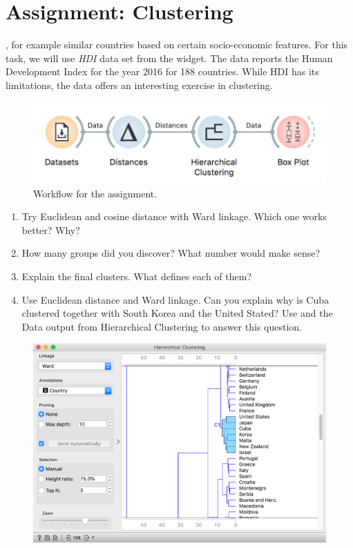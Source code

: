 \chapter{Assignment: Clustering}
\label{hw:clustering}

, for example similar countries based on certain socio-economic features. For this task, we will use \textit{HDI} data set from the  widget. The data reports the Human Development Index for the year 2016 for 188 countries. While HDI has its limitations, the data offers an interesting exercise in clustering.

\begin{figure}[h]
  \centering
  \includegraphics[width=\linewidth]{workflow.png}%
  \caption{Workflow for the assignment.}
\end{figure}

\begin{enumerate}
    \item Try Euclidean and cosine distance with Ward linkage. Which one works better? Why?
    \item How many groups did you discover? What number would make sense?
    \item Explain the final clusters. What defines each of them?
    \item Use Euclidean distance and Ward linkage. Can you explain why is Cuba clustered together with South Korea and the United Stated? Use  and the Data output from Hierarchical Clustering to answer this question.
\end{enumerate}

\begin{figure}
  \includegraphics[scale=0.4]{clustering.png}
\end{figure}
